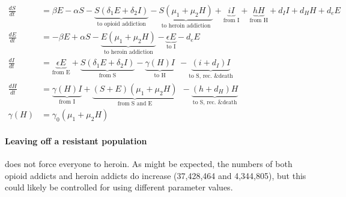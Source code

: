 \documentclass[11pt]{report}
\begin{document}
\begin{align*}
\frac{dS}{dt} &= \beta E - \alpha S - \underbrace{S(\delta_1 E + \delta_2 I)}_{\text{to opioid addiction}} - \underbrace{S(\mu_1+\mu_2H)}_{\text{to heroin addiction}} 
+ \underbrace{iI}_{\text{from I}} + \underbrace{hH}_{\text{from H}} 
+ d_I I + d_H H + d_e E\\
\frac{dE}{dt} &= - \beta E + \alpha S - \underbrace{E(\mu_1 + \mu_2H)}_{\text{to heroin addiction}} - \underbrace{\epsilon E}_{\text{to I}} - d_e E\\
\frac{dI}{dt} &= \underbrace{\epsilon E}_{\text{from E}} + \underbrace{S(\delta_1E+\delta_2I)}_{\text{from S}} - \underbrace{\gamma(H)I}_{\text{to H}}\ \ 
- \underbrace{(i+d_I)I}_{\text{to S, rec. \& death}}\\
\frac{dH}{dt} &= \underbrace{\gamma(H)I}_{\text{from I}} + \underbrace{(S+E)(\mu_1+\mu_2H)}_{\text{from S and E}}\ \ - \underbrace{(h+d_H)H}_{\text{to S, rec. \& death}}\\
\gamma(H) &= \gamma_0(\mu_1+\mu_2H)
\end{align*}

\paragraph{Leaving off a resistant population} does not force everyone to heroin. As might be expected, the numbers of both opioid addicts and heroin addicts do increase (37,428,464 and 4,344,805), but this could likely be controlled for using different parameter values.
\end{document}
